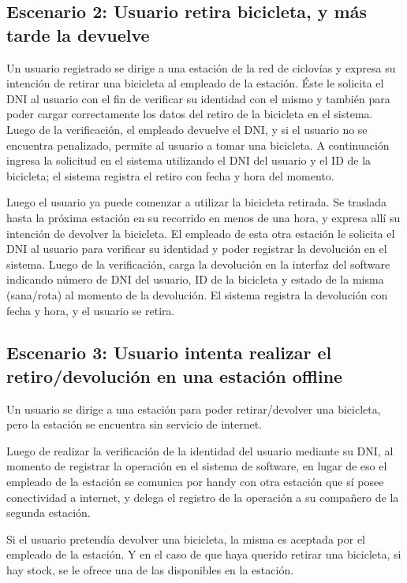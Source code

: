 \documentclass[a4paper, 10pt, twoside]{article}
\begin{document}
\subsection{Escenario 2: Usuario retira bicicleta, y más tarde la devuelve}

Un usuario registrado se dirige a una estación de la red de ciclovías y expresa su intención de retirar una bicicleta al empleado de la estación. Éste le solicita el DNI al usuario con el fin de verificar su identidad con el mismo y también para poder cargar correctamente los datos del retiro de la bicicleta en el sistema. Luego de la verificación, el empleado devuelve el DNI, y si el usuario no se encuentra penalizado, permite al usuario a tomar una bicicleta. A continuación ingresa la solicitud en el sistema utilizando el DNI del usuario y el ID de la bicicleta; el sistema registra el retiro con fecha y hora del momento.

Luego el usuario ya puede comenzar a utilizar la bicicleta retirada. Se traslada hasta la próxima estación en su recorrido en menos de una hora, y expresa allí su intención de devolver la bicicleta. El empleado de esta otra estación le solicita el DNI al usuario para verificar su identidad y poder registrar la devolución en el sistema. Luego de la verificación, carga la devolución en la interfaz del software indicando número de DNI del usuario, ID de la bicicleta y estado de la misma (sana/rota) al momento de la devolución. El sistema registra la devolución con fecha y hora, y el usuario se retira.


\subsection{Escenario 3: Usuario intenta realizar el retiro/devolución en una estación offline}

Un usuario se dirige a una estación para poder retirar/devolver una bicicleta, pero la estación se encuentra sin servicio de internet.

Luego de realizar la verificación de la identidad del usuario mediante su DNI, al momento de registrar la operación en el sistema de software, en lugar de eso el empleado de la estación se comunica por handy con otra estación que sí posee conectividad a internet, y delega el registro de la operación a su compañero de la segunda estación.

Si el usuario pretendía devolver una bicicleta, la misma es aceptada por el empleado de la estación. Y en el caso de que haya querido retirar una bicicleta, si hay stock, se le ofrece una de las disponibles en la estación.
\end{document}
